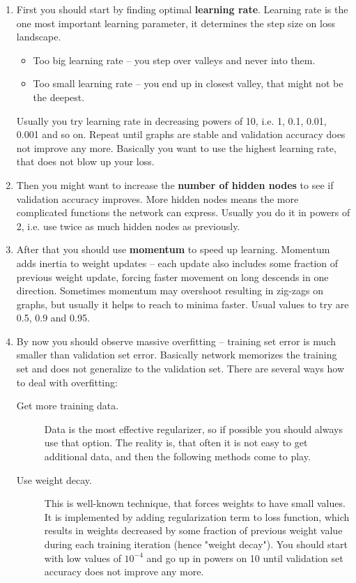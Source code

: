 \documentclass[a4paper,11pt]{article}
\begin{document}
\begin{enumerate}
	\item First you should start by finding optimal \textbf{learning rate}. Learning rate is the one most important learning parameter, it determines the step size on loss landscape. 
	\begin{itemize}	
		\item Too big learning rate -- you step over valleys and never into them. 
		\item Too small learning rate -- you end up in closest valley, that might not be the deepest. 
	\end{itemize}
	Usually you try learning rate in decreasing powers of 10, i.e. 1, 0.1, 0.01, 0.001 and so on. Repeat  until graphs are stable and validation accuracy does not improve any more. Basically you want to use the highest learning rate, that does not blow up your loss.
	\item Then you might want to increase the \textbf{number of hidden nodes} to see if validation accuracy improves. More hidden nodes means the more complicated functions the network can express. Usually you do it in powers of 2, i.e. use twice as much hidden nodes as previously.
	\item After that you should use \textbf{momentum} to speed up learning. Momentum adds inertia to weight updates -- each update also includes some fraction of previous weight update, forcing faster movement on long descends in one direction. Sometimes momentum may overshoot resulting in zig-zags on graphs, but usually it helps to reach to minima faster. Usual values to try are 0.5, 0.9 and 0.95.
	\item By now you should observe massive overfitting -- training set error is much smaller than validation set error. Basically network memorizes the training set and does not generalize to the validation set. There are several ways how to deal with overfitting:
	\begin{description}
		\item[Get more training data.] Data is the most effective regularizer, so if possible you should always use that option. The reality is, that often it is not easy to get additional data, and then the following methods come to play.
		\item[Use weight decay.] This is well-known technique, that forces weights to have small values. It is implemented by adding regularization term to loss function, which results in weights decreased by some fraction of previous weight value during each training iteration (hence "weight decay"). You should start with low values of $10^{-4}$ and go up in powers on 10 until validation set accuracy does not improve any more.

\end{description}
\end{enumerate}
\end{document}
